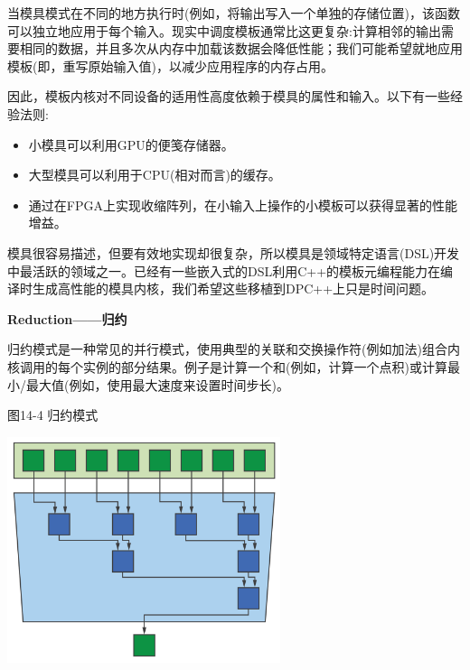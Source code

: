 当模具模式在不同的地方执行时(例如，将输出写入一个单独的存储位置)，该函数可以独立地应用于每个输入。现实中调度模板通常比这更复杂:计算相邻的输出需要相同的数据，并且多次从内存中加载该数据会降低性能；我们可能希望就地应用模板(即，重写原始输入值)，以减少应用程序的内存占用。\par

因此，模板内核对不同设备的适用性高度依赖于模具的属性和输入。以下有一些经验法则:\par

\begin{itemize}
	\item 小模具可以利用GPU的便笺存储器。
	\item 大型模具可以利用于CPU(相对而言)的缓存。
	\item 通过在FPGA上实现收缩阵列，在小输入上操作的小模板可以获得显著的性能增益。
\end{itemize}

模具很容易描述，但要有效地实现却很复杂，所以模具是领域特定语言(DSL)开发中最活跃的领域之一。已经有一些嵌入式的DSL利用C++的模板元编程能力在编译时生成高性能的模具内核，我们希望这些移植到DPC++上只是时间问题。\par

\hspace*{\fill} \par %
\textbf{Reduction——归约}

归约模式是一种常见的并行模式，使用典型的关联和交换操作符(例如加法)组合内核调用的每个实例的部分结果。例子是计算一个和(例如，计算一个点积)或计算最小/最大值(例如，使用最大速度来设置时间步长)。\par

\hspace*{\fill} \par %
图14-4 归约模式
\begin{center}
	\includegraphics[width=0.6\textwidth]{content/chapter-14/images/4}
\end{center}

